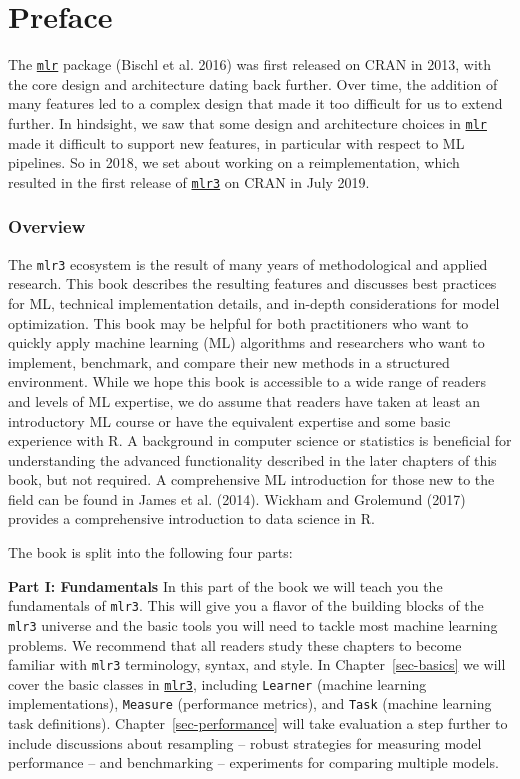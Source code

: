 \chapter*{Preface}

The \href{https://cran.r-project.org/package=mlr}{\texttt{mlr}}
package (Bischl et al. 2016) was first released on CRAN in 2013, with
the core design and architecture dating back further. Over time, the
addition of many features led to a complex design that made it too
difficult for us to extend further. In hindsight, we saw that some
design and architecture choices in
\href{https://cran.r-project.org/package=mlr}{\texttt{mlr}} made it
difficult to support new features, in particular with respect to ML
pipelines. So in 2018, we set about working on a reimplementation, which
resulted in the first release of
\href{https://mlr3.mlr-org.com}{\texttt{mlr3}} on
CRAN in July 2019.

\subsection*{Overview}

The \texttt{mlr3} ecosystem is the result of many years of
methodological and applied research. This book describes the resulting
features and discusses best practices for ML, technical implementation
details, and in-depth considerations for model optimization. This book
may be helpful for both practitioners who want to quickly apply machine
learning (ML) algorithms and researchers who want to implement,
benchmark, and compare their new methods in a structured environment.
While we hope this book is accessible to a wide range of readers and
levels of ML expertise, we do assume that readers have taken at least an
introductory ML course or have the equivalent expertise and some basic
experience with R. A background in computer science or statistics is
beneficial for understanding the advanced functionality described in the
later chapters of this book, but not required. A comprehensive ML
introduction for those new to the field can be found in James et al.
(2014). Wickham and Grolemund (2017) provides a comprehensive
introduction to data science in R.

The book is split into the following four parts:

\textbf{Part I: Fundamentals} In this part of the book we will teach you
the fundamentals of \texttt{mlr3}. This will give you a flavor of the
building blocks of the \texttt{mlr3} universe and the basic tools you
will need to tackle most machine learning problems. We recommend that
all readers study these chapters to become familiar with \texttt{mlr3}
terminology, syntax, and style. In Chapter~\ref{sec-basics} we will
cover the basic classes in
\href{https://mlr3.mlr-org.com}{\texttt{mlr3}},
including \texttt{Learner} (machine learning implementations),
\texttt{Measure} (performance metrics), and \texttt{Task} (machine
learning task definitions). Chapter~\ref{sec-performance} will take
evaluation a step further to include discussions about resampling --
robust strategies for measuring model performance -- and benchmarking --
experiments for comparing multiple models.

